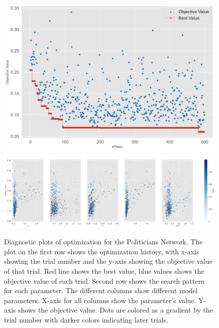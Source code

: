 \documentclass[11pt]{article}
\begin{document}
\begin{figure}[H]
    \centering
    \includegraphics[width=.7\linewidth]{../plots/overall/Optimization_History_politicians.png}
    \includegraphics[width=.7\linewidth]{../plots/overall/Plot_Slice_politicians.png}
  \caption{Diagnostic plots of optimization for the Politicians Network. The plot on the first row shows the optimization history, with x-axis showing the trial number and the y-axis showing the objective value of that trial. Red line shows the best value, blue values shows the objective value of each trial. Second row shows the search pattern for each parameter. The different columns show different model parameters. X-axis for all columns show the parameter's value. Y-axis shows the objective value. Dots are colored as a gradient by the trial number with darker colors indicating later trials.}
  \label{appendix:optimization_politicians}
\end{figure}
\end{document}
